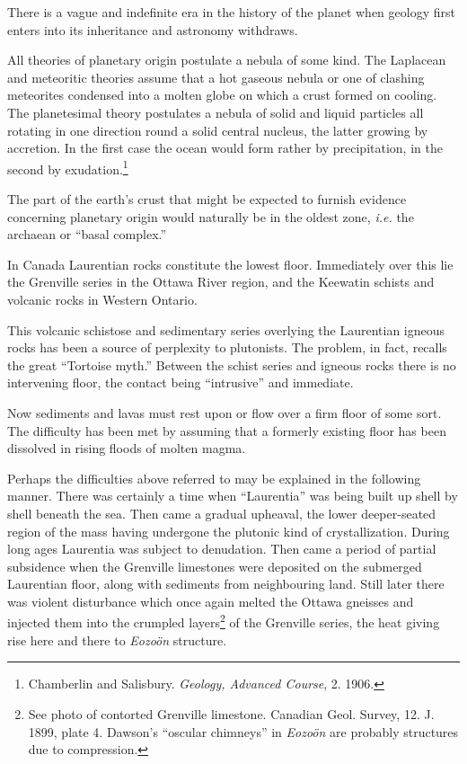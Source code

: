 \documentclass[a4paper, 12pt, oneside]{article}
\begin{document}
There is a vague and indefinite era in the history of the planet when geology first enters into its inheritance and astronomy withdraws.

All theories of planetary origin postulate a nebula of some kind. The Laplacean and meteoritic theories assume that a hot gaseous nebula or one of clashing meteorites condensed into a molten globe on which a crust formed on cooling. The planetesimal theory postulates a nebula of solid and liquid particles all rotating in one direction round a solid central nucleus, the latter growing by accretion. In the first case the ocean would form rather by precipitation, in the second by exudation.\footnote{Chamberlin and Salisbury. \emph{Geology, Advanced Course}, 2. 1906.}

The part of the earth's crust that might be expected to furnish evidence concerning planetary origin would naturally be in the oldest zone, \emph{i.e.} the archaean or ``basal complex.''

In Canada Laurentian rocks constitute the lowest floor. Immediately over this lie the Grenville series in the Ottawa River region, and the Keewatin schists and volcanic rocks in Western Ontario.

This volcanic schistose and sedimentary series overlying the Laurentian igneous rocks has been a source of perplexity to plutonists. The problem, in fact, recalls the great ``Tortoise myth.'' Between the schist series and igneous rocks there is no intervening floor, the contact being ``intrusive'' and immediate.

Now sediments and lavas must rest upon or flow over a firm floor of some sort. The difficulty has been met by assuming that a formerly existing floor has been dissolved in rising floods of molten magma.

Perhaps the difficulties above referred to may be explained in the following manner. There was certainly a time when ``Laurentia'' was being built up shell by shell beneath the sea. Then came a gradual upheaval, the lower deeper-seated region of the mass having undergone the plutonic kind of crystallization. During long ages Laurentia was subject to denudation. Then came a period of partial subsidence when the Grenville limestones were deposited on the submerged Laurentian floor, along with sediments from neighbouring land. Still later there was violent disturbance which once again melted the Ottawa gneisses and injected them into the crumpled layers\footnote{See photo of contorted Grenville limestone. Canadian Geol. Survey, 12. J. 1899, plate 4. Dawson's ``oscular chimneys'' in \emph{Eozoön} are probably structures due to compression.} of the Grenville series, the heat giving rise here and there to \emph{Eozoön} structure.
\end{document}
